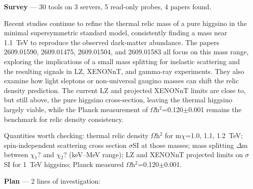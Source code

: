 \documentclass[11pt,a4paper]{article}
\begin{document}
\textbf{Survey} --- 30 tools on 3 servers, 5 read-only probes, 4 papers found.

Recent studies continue to refine the thermal relic mass of a pure higgsino in the minimal supersymmetric standard model, consistently finding a mass near 1.1~TeV to reproduce the observed dark-matter abundance.  The papers 2609.01590, 2609.01475, 2609.01504, and 2609.01583 all focus on this mass range, exploring the implications of a small mass splitting for inelastic scattering and the resulting signals in LZ, XENONnT, and gamma-ray experiments.  They also examine how light sleptons or non-universal gaugino masses can shift the relic density prediction.  The current LZ and projected XENONnT limits are close to, but still above, the pure higgsino cross-section, leaving the thermal higgsino largely viable, while the Planck measurement of $\Omega$h$^2$=0.120$\pm$0.001 remains the benchmark for relic density consistency.

Quantities worth checking: thermal relic density $\Omega$h$^2$ for m$\chi$=1.0, 1.1, 1.2~TeV; spin-independent scattering cross section $\sigma$SI at those masses; mass splitting $\Delta$m between $\chi$$_1$? and $\chi$$_2$? (keV--MeV range); LZ and XENONnT projected limits on $\sigma$SI for 1~TeV higgsino; Planck measured $\Omega$h$^2$=0.120$\pm$0.001.

\textbf{Plan} --- 2 lines of investigation:
\end{document}
